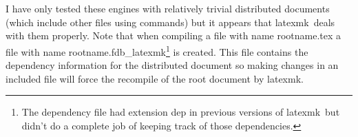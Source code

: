 \documentclass[11pt]{article}
\newcommand{\cmd}[1]{\textsf{#1}}
\newcommand{\latexmk}{\textsf{latexmk}}
\begin{document}
I have only tested these engines with relatively trivial distributed documents (which include other files using \verb|| commands) but it appears that \latexmk\ deals with them properly. Note that when compiling a file with name \cmd{rootname.tex} a file with name \cmd{rootname.fdb\_latexmk}\footnote{The dependency file had extension \cmd{dep} in previous versions of \latexmk\ but didn't do a complete job of keeping track of those dependencies.} is created. This file contains the dependency information for the distributed document so making changes in an included file will force the recompile of the root document by \latexmk.

%
%
%
\end{document}
